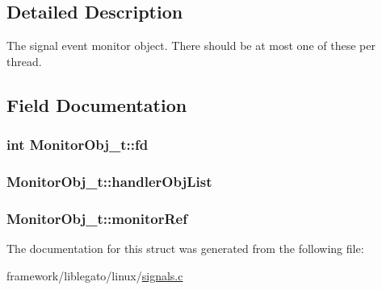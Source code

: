 \subsection{Detailed Description}
The signal event monitor object. There should be at most one of these per thread. 

\subsection{Field Documentation}
\subsubsection[{\texorpdfstring{fd}{fd}}]{\setlength{\rightskip}{0pt plus 5cm}int Monitor\+Obj\+\_\+t\+::fd}\hypertarget{struct_monitor_obj__t_ae4e0e16b7fd09b21b9d274974b5bed9a}{}\label{struct_monitor_obj__t_ae4e0e16b7fd09b21b9d274974b5bed9a}
\subsubsection[{\texorpdfstring{handler\+Obj\+List}{handlerObjList}}]{ Monitor\+Obj\+\_\+t\+::handler\+Obj\+List}\hypertarget{struct_monitor_obj__t_ae016d8a2a8ed7dbcbe75548abd24aca6}{}\label{struct_monitor_obj__t_ae016d8a2a8ed7dbcbe75548abd24aca6}
\subsubsection[{\texorpdfstring{monitor\+Ref}{monitorRef}}]{ Monitor\+Obj\+\_\+t\+::monitor\+Ref}\hypertarget{struct_monitor_obj__t_a5f0df1aa043a0cc1dc346ae82975cdd0}{}\label{struct_monitor_obj__t_a5f0df1aa043a0cc1dc346ae82975cdd0}


The documentation for this struct was generated from the following file\+:\begin{DoxyCompactItemize}
\item 
framework/liblegato/linux/\hyperlink{signals_8c}{signals.\+c}\end{DoxyCompactItemize}
